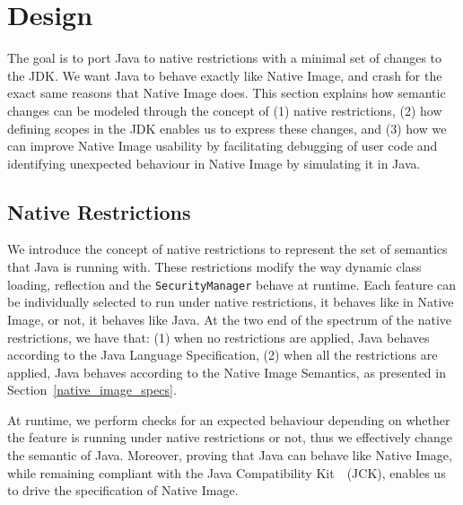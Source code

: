 

\chapter{Design}

The goal is to port Java to native restrictions with a minimal set of changes to the JDK. We want Java to behave exactly like Native Image, and crash for the exact same reasons that Native Image does. 
This section explains how semantic changes can be modeled through the concept of (1) native restrictions, (2) how defining scopes in the JDK enables us to express these changes, and (3) how we can improve Native Image usability by facilitating debugging of user code and identifying unexpected behaviour in Native Image by simulating it in Java.

\section{Native Restrictions}
We introduce the concept of native restrictions to represent the set of semantics that Java is running with. These restrictions modify the way dynamic class loading, reflection and the \verb|SecurityManager| behave at runtime. Each feature can be individually selected to run under native restrictions, it behaves like in Native Image, or not, it behaves like Java.
At the two end of the spectrum of the native restrictions, we have that: (1) when no restrictions are applied, Java behaves according to the Java Language Specification, (2) when all the restrictions are applied, Java behaves according to the Native Image Semantics, as presented in Section~\ref{native_image_specs}. 

At runtime, we perform checks for an expected behaviour depending on whether the feature is running under native restrictions or not, thus we effectively change the semantic of Java.
Moreover, proving that Java can behave like Native Image, while remaining compliant with the Java Compatibility Kit~\cite{noauthor_gaining_nodate}~(JCK), enables us to drive the specification of Native Image.

